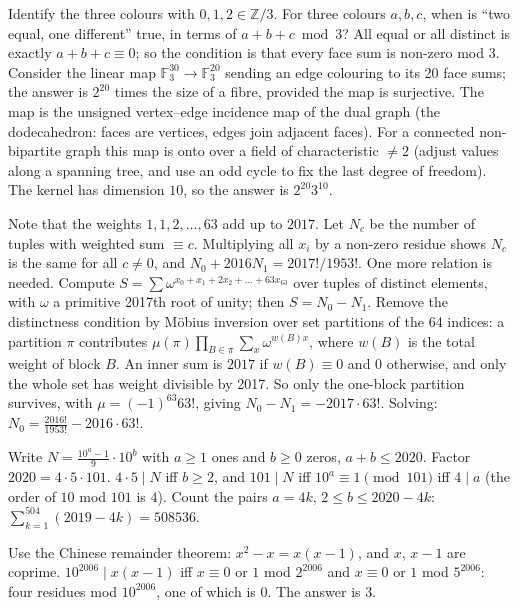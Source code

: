 \documentclass[11pt,a4paper]{article}
\begin{document}

Identify the three colours with \(0,1,2\in\mathbb Z/3\). For three colours \(a,b,c\), when is ``two equal, one different'' true, in terms of \(a+b+c \bmod 3\)?
All equal or all distinct is exactly \(a+b+c\equiv0\); so the condition is that every face sum is non-zero mod 3. Consider the linear map \(\mathbb F_3^{30}\to\mathbb F_3^{20}\) sending an edge colouring to its 20 face sums; the answer is \(2^{20}\) times the size of a fibre, provided the map is surjective.
The map is the unsigned vertex--edge incidence map of the dual graph (the dodecahedron: faces are vertices, edges join adjacent faces). For a connected non-bipartite graph this map is onto over a field of characteristic \(\ne2\) (adjust values along a spanning tree, and use an odd cycle to fix the last degree of freedom). The kernel has dimension \(10\), so the answer is \(2^{20}3^{10}\).

Note that the weights \(1,1,2,\dots,63\) add up to \(2017\). Let \(N_c\) be the number of tuples with weighted sum \(\equiv c\). Multiplying all \(x_i\) by a non-zero residue shows \(N_c\) is the same for all \(c\ne0\), and \(N_0+2016N_1=2017!/1953!\). One more relation is needed.
Compute \(S=\sum\omega^{x_0+x_1+2x_2+\dots+63x_{63}}\) over tuples of distinct elements, with \(\omega\) a primitive 2017th root of unity; then \(S=N_0-N_1\). Remove the distinctness condition by Möbius inversion over set partitions of the 64 indices: a partition \(\pi\) contributes \(\mu(\pi)\prod_{B\in\pi}\sum_x\omega^{w(B)x}\), where \(w(B)\) is the total weight of block \(B\).
An inner sum is \(2017\) if \(w(B)\equiv0\) and \(0\) otherwise, and only the whole set has weight divisible by 2017. So only the one-block partition survives, with \(\mu=(-1)^{63}63!\), giving \(N_0-N_1=-2017\cdot63!\). Solving: \(N_0=\frac{2016!}{1953!}-2016\cdot63!\).

Write \(N=\frac{10^a-1}{9}\cdot10^b\) with \(a\ge1\) ones and \(b\ge0\) zeros, \(a+b\le2020\). Factor \(2020=4\cdot5\cdot101\).
\(4\cdot5\mid N\) iff \(b\ge2\), and \(101\mid N\) iff \(10^a\equiv1\pmod{101}\) iff \(4\mid a\) (the order of \(10\) mod \(101\) is \(4\)). Count the pairs \(a=4k\), \(2\le b\le2020-4k\): \(\sum_{k=1}^{504}(2019-4k)=508536\).

Use the Chinese remainder theorem: \(x^2-x=x(x-1)\), and \(x\), \(x-1\) are coprime.
\(10^{2006}\mid x(x-1)\) iff \(x\equiv0\) or \(1\) mod \(2^{2006}\) and \(x\equiv0\) or \(1\) mod \(5^{2006}\): four residues mod \(10^{2006}\), one of which is \(0\). The answer is \(3\).
\end{document}
